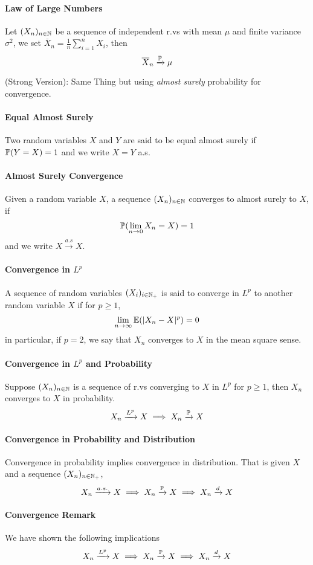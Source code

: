 \paragraph{Law of Large Numbers}
Let \((X_n)_{n \in \mathbb{N}}\) be a sequence of independent r.vs with mean \(\mu\) and finite variance \(\sigma^2\), we set \(\overline{X}_n = \frac{1}{n}\sum_{i=1}^n X_i\), then
\[\overline{X}_n \xrightarrow{\mathbb{P}}\mu\]

(Strong Version): Same Thing but using \textit{almost surely} probability for convergence.

\paragraph{Equal Almost Surely}
Two random variables \(X\) and \(Y\) are said to be equal almost surely if \(\mathbb{P}(Y = X) = 1\) and we write \(X = Y\) a.s.

\paragraph{Almost Surely Convergence}
Given a random variable \(X\), a sequence \((X_n)_{n \in\mathbb{N}}\) converges to almost surely to \(X\), if
\[\mathbb{P}(\lim_{n\to 0} X_n = X) = 1\]
and we write \(X \xrightarrow{a.s} X\).

\paragraph{Convergence in \(L^p\)}
A sequence of random variables \((X_i)_{i \in \mathbb{N}_+}\) is said to converge in \(L^p\) to another random variable \(X\) if for \(p \geq 1\),
\[\lim_{n \to \infty} \mathbb{E}(|X_n - X|^p) = 0\]
in particular, if \(p = 2\), we say that \(X_n\) converges to \(X\) in the mean square sense.

\paragraph{Convergence in \(L^p\) and Probability}
Suppose \((X_n)_{n \in \mathbb{N}}\) is a sequence of r.vs converging to \(X\) in \(L^p\) for \(p \geq 1\), then \(X_n\) converges to \(X\) in probability.
\[X_n \xrightarrow{L^p} X \implies X_n \xrightarrow{\mathbb{P}} X\]

\paragraph{Convergence in Probability and Distribution}
Convergence in probability implies convergence in distribution. That is given \(X\) and a sequence \((X_n)_{n \in\mathbb{N}_+}\),
\[X_n \xrightarrow{a.s.} X \implies X_n \xrightarrow{\mathbb{P}} X \implies X_n \xrightarrow{d} X\]

\paragraph{Convergence Remark}
We have shown the following implications
\[X_n \xrightarrow{L^p} X \implies X_n \xrightarrow{\mathbb{P}} X \implies X_n \xrightarrow{d} X\]